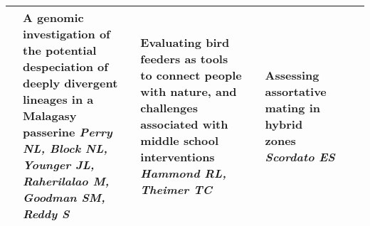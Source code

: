 \begin{tabular}{|x{0.75cm}|x{2.25cm}|x{2.25cm}|a{2.25cm}|a{2.25cm}|a{2.25cm}|a{2.25cm}|}
\hline
{}&A genomic investigation of the potential despeciation of deeply divergent lineages in a Malagasy passerine \newline \newline \textit{Perry NL, Block NL, Younger JL, Raherilalao M, Goodman SM, Reddy S} & Evaluating bird feeders as tools to connect people with nature, and challenges associated with middle school interventions \newline \newline \textit{Hammond RL, Theimer TC} &  \newline \newline \textit{} & Assessing assortative mating in hybrid zones \newline \newline \textit{Scordato ES} &  \newline \newline \textit{} &  \newline \newline \textit{}\\
\hline
\end{tabular}
